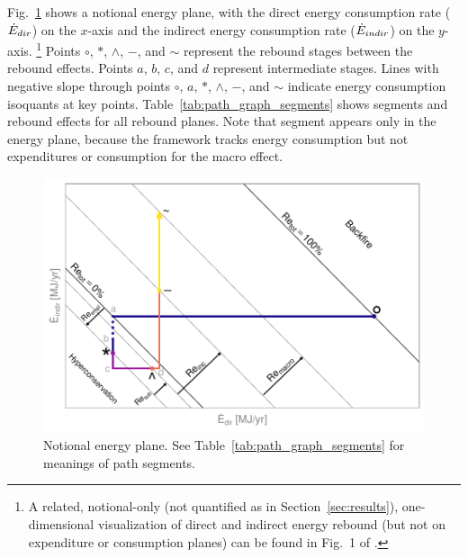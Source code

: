 \documentclass[12pt]{article}\usepackage[]{graphicx}\usepackage[]{xcolor}
\makeatletter
\def\maxwidth{ %
  \ifdim\Gin@nat@width>\linewidth
    \linewidth
  \else
    \Gin@nat@width
  \fi
}
\newenvironment{knitrout}{}{} %
\makeatother
\begin{document}
Fig.~\ref{fig:ExampleEnergyPathGraph} shows a notional energy plane, with 
the direct energy consumption rate ($\dot{E}_{dir}$) on the $x$-axis
and
the indirect energy consumption rate ($\dot{E}_{indir}$) on the $y$-axis.%
\footnote{
  A related, notional-only (not quantified as in Section~\ref{sec:results}), 
  one-dimensional visualization of direct and indirect energy rebound 
  (but not on expenditure or consumption planes)
  can be found in Fig.~1 of \cite{Exadaktylos:2021aa}.}
%
Points $\circ$, $*$, $\wedge$, $-$, and $\sim$ represent the rebound stages
between the rebound effects.
Points $a$, $b$, $c$, and $d$ represent intermediate stages.
Lines with negative slope through points 
$\circ$, $a$, $*$, $\wedge$, $-$, and $\sim$
indicate energy consumption isoquants
at key points.
Table~\ref{tab:path_graph_segments} shows 
segments and rebound effects for all rebound planes.
Note that segment \bartilde{} appears only in the energy plane, 
because the framework tracks energy consumption but not expenditures or consumption
for the macro effect.

\begin{knitrout}
\color{fgcolor}\begin{figure}

{\centering \includegraphics[width=\maxwidth]{figure/ExampleEnergyPathGraph-1} 

}

\caption{Notional energy plane. See Table~\ref{tab:path_graph_segments} for meanings of path segments.}\label{fig:ExampleEnergyPathGraph}
\end{figure}

\end{knitrout}
\end{document}
